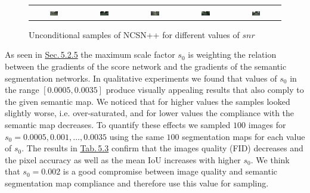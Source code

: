 \begin{figure}
\begin{tabular}{ccccc}
        \\
        \includegraphics[width=0.19\textwidth]{Chapters/figures/experiments/cityscapes/snr/0.075/4_uncond_sample.png} & 
        \includegraphics[width=0.19\textwidth]{Chapters/figures/experiments/cityscapes/snr/0.1/9_uncond_sample.png} & 
        \includegraphics[width=0.19\textwidth]{Chapters/figures/experiments/cityscapes/snr/0.125/4_uncond_sample.png} &
        \includegraphics[width=0.19\textwidth]{Chapters/figures/experiments/cityscapes/snr/0.15/17_uncond_sample.png} & \includegraphics[width=0.19\textwidth]{Chapters/figures/experiments/cityscapes/snr/0.175/8_uncond_sample.png}
    \end{tabular}
    \caption{Unconditional samples of NCSN++ for different values of $snr$}
\end{figure}
%

As seen in \hyperref[sec:5.2.5]{Sec.\,5.2.5} the maximum scale factor $s_0$ is weighting the relation between the gradients of the score network and the gradients of the semantic segmentation networks. In qualitative experiments we found that values of $s_0$ in the range $[0.0005,0.0035]$ produce visually appealing results that also comply to the given semantic map. We noticed that for higher values the samples looked slightly worse, i.e. over-saturated, and for lower values the compliance with the semantic map decreases. To quantify these effects we sampled $100$ images for $s_0=0.0005, 0.001, \dots, 0.0035$ using the same $100$ segmentation maps for each value of $s_0$. The results in \hyperref[tab:5.3]{Tab.\,5.3} confirm that the images quality (FID) decreases and the pixel accuracy as well as the mean IoU increases with higher $s_0$. We think that $s_0=0.002$ is a good compromise between image quality and semantic segmentation map compliance and therefore use this value for sampling.

